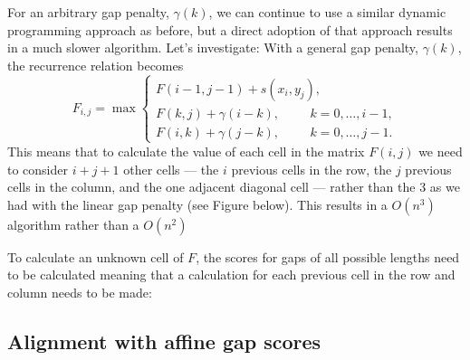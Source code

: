 \documentclass[11pt]{article}
\begin{document}
For an arbitrary  gap penalty,  $\gamma(k)$, we can continue to use a similar dynamic programming approach as before, but a direct adoption of that approach results in a much slower algorithm. Let's investigate: With a general gap penalty, $\gamma(k)$, the recurrence relation becomes 
\[ F_{i,j}= \max 
\begin{cases}
F(i-1,j-1)+s(x_i,y_j), \\
F(k,j) + \gamma(i - k), \hspace{1cm} k = 0,\ldots,i-1,  \\
F(i,k) + \gamma(j-k),\hspace{1cm} k = 0,\ldots,j-1  .
\end{cases} \]
This means that to calculate the value of each cell in the matrix $F(i,j)$ we need to consider $i+j+1$ other cells --- the $i$ previous cells in the row, the $j$ previous cells in the column, and the one adjacent diagonal cell --- rather than the 3 as we had with the linear gap penalty (see Figure below).  This results in a $O(n^3)$ algorithm rather than a $O(n^2)$

To calculate an unknown cell of $F$, the scores for gaps of all possible lengths need to be calculated meaning that a calculation for each previous cell in the row and column needs to be made: \\


\subsection{Alignment with affine gap scores}
\end{document}
